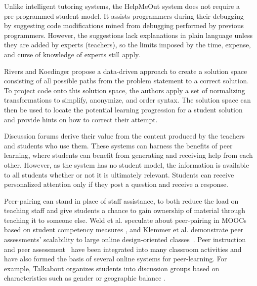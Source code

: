 
Unlike intelligent tutoring systems, the HelpMeOut system \cite{helpmeout} does not require a pre-programmed student model. It assists programmers during their debugging by suggesting code modifications mined from debugging performed by previous programmers. However, the suggestions lack explanations in plain language unless they are added by experts (teachers), so the limits imposed by the time, expense, and curse of knowledge of experts still apply.

Rivers and Koedinger \cite{riversaied} propose a data-driven approach to create a solution space consisting of all possible paths from the problem statement to a correct solution. To project code onto this solution space, the authors apply a set of normalizing transformations to simplify, anonymize, and order syntax. The solution space can then be used to locate the potential learning progression for a student solution and provide hints on how to correct their attempt.

Discussion forums derive their value from the content produced by the teachers and students who use them. These systems can harness the benefits of peer learning, where students can benefit from generating and receiving help from each other. However, as the system has no student model, the information is available to all students whether or not it is ultimately relevant. Students can receive personalized attention only if they post a question and receive a response. 

Peer-pairing can stand in place of staff assistance, to both reduce the load on teaching staff and give students a chance to gain ownership of material through teaching it to someone else. Weld et al. speculate about peer-pairing in MOOCs based on student competency measures \cite{WeldHcomp12}, and Klemmer et al. demonstrate peer assessments' scalability to large online design-oriented classes~\cite{Klemmer}. Peer instruction~\cite{mazur} and peer assessment~\cite{peerassessment} have been integrated into many classroom activities and have also formed the basis of several online systems for peer-learning. For example, Talkabout organizes students into discussion groups based on characteristics such as gender or geographic balance \cite{talkabout}.


